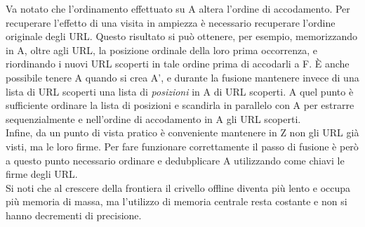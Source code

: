 Va notato che l'ordinamento effettuato su A altera l'ordine di accodamento. Per recuperare l'effetto di una visita in ampiezza è necessario recuperare l'ordine originale degli URL. Questo risultato si può ottenere, per esempio, memorizzando in A, oltre agli URL, la posizione ordinale della loro prima occorrenza, e riordinando i nuovi URL scoperti in tale ordine prima di accodarli a F. È anche possibile tenere A quando si crea A', e durante la fusione mantenere invece di una lista di URL scoperti una lista di \textit{posizioni} in A di URL scoperti. A quel punto è sufficiente ordinare la lista di posizioni e scandirla in parallelo con A per estrarre sequenzialmente e nell'ordine di accodamento in A gli URL scoperti.\\
Infine, da un punto di vista pratico è conveniente mantenere in Z non gli URL già visti, ma le loro firme. Per fare funzionare correttamente il passo di fusione è però a questo punto necessario ordinare e dedubplicare A utilizzando come chiavi le firme degli URL.\\
Si noti che al crescere della frontiera il crivello offline diventa più lento e occupa più memoria di massa, ma l'utilizzo di memoria centrale resta costante e non si hanno decrementi di precisione.
